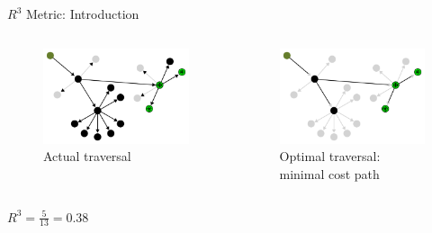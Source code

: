 \begin{frame}{$R^{3}$ Metric: Introduction}
  \centering
  \begin{columns}[c]
    \begin{figure}
      \includegraphics[width=\linewidth]{images/r3-metric-bad-traversal.pdf}
      \caption{\small Actual traversal}
    \end{figure}

    \begin{figure}
      \includegraphics[width=\linewidth]{images/r3-metric-good-traversal.pdf}
      \caption{\small Optimal traversal: minimal cost path}
    \end{figure}
  \end{columns}

  \vspace{1em}
  \small $ R^{3} = \frac{5}{13} = 0.38$
\end{frame}